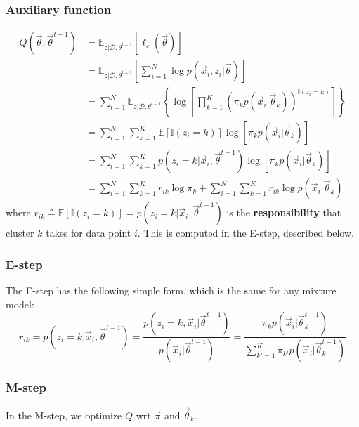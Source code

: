 \subsubsection{Auxiliary function}
\begin{align}
Q(\vec{\theta}, \vec{\theta}^{t-1}) & =\mathbb{E}_{z|\mathcal{D},\theta^{t-1}}\left[\ell_c(\vec{\theta})\right] \nonumber \\
    & = \mathbb{E}_{z|\mathcal{D},\theta^{t-1}}\left[\sum\limits_{i=1}^N \log p(\vec{x}_i,z_i|\vec{\theta})\right] \nonumber \\
	& = \sum\limits_{i=1}^N \mathbb{E}_{z|\mathcal{D},\theta^{t-1}}\left\{\log\left[\prod\limits_{k=1}^K \left(\pi_kp(\vec{x}_i|\vec{\theta}_k)\right)^{\mathbb{I}(z_i=k)}\right]\right\} \nonumber \\
	& = \sum\limits_{i=1}^N{\sum\limits_{k=1}^K{\mathbb{E}[\mathbb{I}(z_i=k)]\log\left[\pi_kp(\vec{x}_i|\vec{\theta}_k)\right]}} \nonumber \\
	& = \sum\limits_{i=1}^N{\sum\limits_{k=1}^K{p(z_i=k|\vec{x}_i,\vec{\theta}^{t-1})\log\left[\pi_kp(\vec{x}_i|\vec{\theta}_k)\right]}} \nonumber \\
	& = \sum\limits_{i=1}^N{\sum\limits_{k=1}^K{r_{ik}\log \pi_k}}+\sum\limits_{i=1}^N{\sum\limits_{k=1}^K{r_{ik}\log p(\vec{x}_i|\vec{\theta}_k)}} \label{eqn:Q-miture-model}
\end{align}
where $r_{ik} \triangleq \mathbb{E}[\mathbb{I}(z_i=k)]=p(z_i=k|\vec{x}_i,\vec{\theta}^{t-1})$ is the \textbf{responsibility} that cluster $k$ takes for data point $i$. This is computed in the E-step, described below.


\subsubsection{E-step}
The E-step has the following simple form, which is the same for any mixture model:
\begin{equation}
r_{ik}=p(z_i=k|\vec{x}_i,\vec{\theta}^{t-1})=\frac{p(z_i=k,\vec{x}_i|\vec{\theta}^{t-1})}{p(\vec{x}_i|\vec{\theta}^{t-1})}=\frac{\pi_kp(\vec{x}_i|\vec{\theta}_k^{t-1})}{\sum_{k'=1}^K \pi_{k'}p(\vec{x}_i|\vec{\theta}_k^{t-1})}
\end{equation}

\subsubsection{M-step}
In the M-step, we optimize $Q$ wrt $\vec{\pi}$ and $\vec{\theta}_k$.

